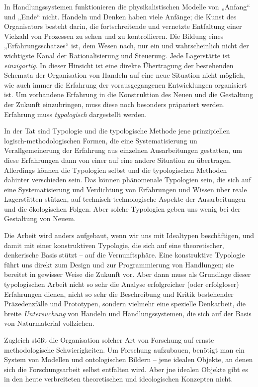 \documentclass[11pt,a4paper]{article}
\begin{document}
In Handlungssystemen funktionieren die physikalistischen Modelle von „Anfang“
und „Ende“ nicht.  Handeln und Denken haben viele Anfänge; die Kunst des
Organisators besteht darin, die fortschreitende und vernetzte Entfaltung einer
Vielzahl von Prozessen zu sehen und zu kontrollieren. Die Bildung eines
„Erfahrungsschatzes“ ist, dem Wesen nach, nur ein und wahrscheinlich nicht der
wichtigste Kanal der Rationalisierung und Steuerung. Jede Lagerstätte ist
\emph{einzigartig}. In dieser Hinsicht ist eine direkte Übertragung der
bestehenden Schemata der Organisation von Handeln auf eine neue Situation
nicht möglich, wie auch immer die Erfahrung der vorausgegangenen Entwicklungen
organisiert ist. Um vorhandene Erfahrung in die Konstruktion des Neuen und die
Gestaltung der Zukunft einzubringen, muss diese noch besonders präpariert
werden.  Erfahrung muss \emph{typologisch} dargestellt werden.

In der Tat sind Typologie und die typologische Methode jene prinzipiellen
logisch-methodolo\-gischen Formen, die eine Systematisierung un
Verallgemeinerung der Erfahrung aus einzelnen Ausarbeitungen gestatten, um
diese Erfahrungen dann von einer auf eine andere Situation zu übertragen.
Allerdings können die Typologien selbst und die typologischen Methoden
dahinter verschieden sein. Das können phänomenale Typologien sein, die sich
auf eine Systematisierung und Verdichtung von Erfahrungen und Wissen über
reale Lagerstätten stützen, auf technisch-technologische Aspekte der
Ausarbeitungen und die ökologischen Folgen. Aber solche Typologien geben uns
wenig bei der Gestaltung von Neuem.

Die Arbeit wird anders aufgebaut, wenn wir uns mit Idealtypen beschäftigen,
und damit mit einer konstruktiven Typologie, die sich auf eine theoretischer,
denkerische Basis stützt -- auf die Vernunftsphäre. Eine konstruktive
Typologie führt uns direkt zum Design und zur Programmierung von Handlungen;
sie bereitet in gewisser Weise die Zukunft vor. Aber dann muss als Grundlage
dieser typologischen Arbeit nicht so sehr die Analyse erfolgreicher (oder
erfolgloser) Erfahrungen dienen, nicht so sehr die Beschreibung und Kritik
bestehender Präzedenzfälle und Prototypen, sondern vielmehr eine spezielle
Denkarbeit, die breite \emph{Untersuchung} von Handeln und Handlungssystemen,
die sich auf der Basis von Naturmaterial vollziehen.

Zugleich stößt die Organisation solcher Art von Forschung auf ernste
methodologische Schwierigkeiten. Um Forschung aufzubauen, benötigt man ein
System von Modellen und ontologischen Bildern -- jene idealen Objekte, an
denen sich die Forschungsarbeit selbst entfalten wird. Aber jne idealen
Objekte gibt es in den heute verbreiteten theoretischen und ideologischen
Konzepten nicht.
\end{document}
